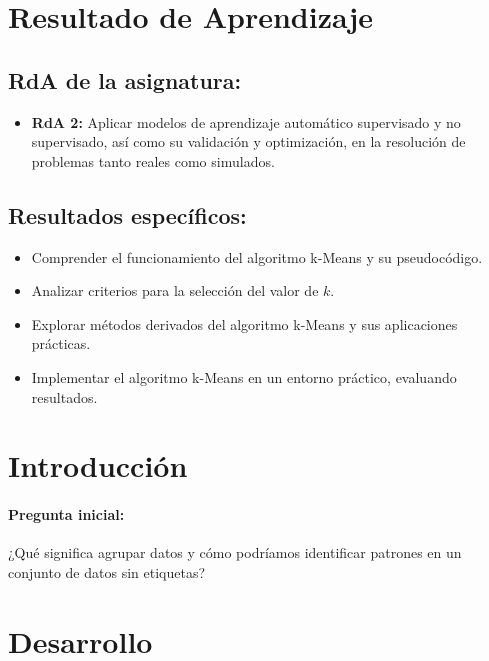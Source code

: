 \documentclass[a4,11pt]{aleph-notas}
\begin{document}
\encabezado


\section*{Resultado de Aprendizaje}

\subsection*{RdA de la asignatura:}
\begin{itemize}[leftmargin=*]
    \item \textbf{RdA 2:} 
    Aplicar modelos de aprendizaje automático supervisado y no supervisado, así como su validación y optimización, en la resolución de problemas tanto reales como simulados.
\end{itemize}

\subsection*{Resultados específicos:}
\begin{itemize}[leftmargin=*]
    \item Comprender el funcionamiento del algoritmo k-Means y su pseudocódigo.
    \item Analizar criterios para la selección del valor de \( k \).
    \item Explorar métodos derivados del algoritmo k-Means y sus aplicaciones prácticas.
    \item Implementar el algoritmo k-Means en un entorno práctico, evaluando resultados.
\end{itemize}

\section*{Introducción}

\paragraph{Pregunta inicial:} 
¿Qué significa agrupar datos y cómo podríamos identificar patrones en un conjunto de datos sin etiquetas?

\section*{Desarrollo}
\end{document}
